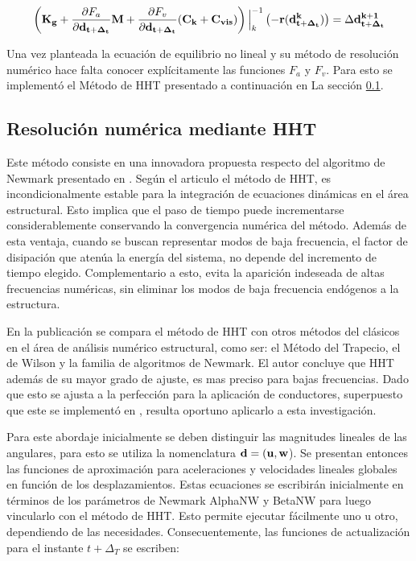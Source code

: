 \begin{equation}\label{Eq:Pre:Incremento}
	\left (\bf{K}_g+\frac{\partial\text{$ F_a$}}{\partial \bf{{d}}_{t+\Delta_t}}\bf{M} + \frac{\partial\text{$ F_v$}}{\partial \bf{{d}}_{t+\Delta_t}}(\bf{C}_k+\bf{C}_{vis} )  \right)\Big|_k^{-1} \left(-\bf{r}(\bf{d}^k_{t+\Delta_t})\right)=  \Delta\bf{d}^{k+1}_{t+\Delta_t}
\end{equation}

Una vez planteada la ecuación de equilibrio no lineal y su método de resolución numérico hace falta conocer explícitamente las funciones $F_a$ y $F_v$. Para esto se implementó el Método de HHT presentado a continuación en La sección \ref{Sec:MET:HHT}. 



\subsection{Resolución numérica mediante HHT}\label{Sec:MET:HHT}
%
 Este método consiste en una innovadora propuesta respecto del algoritmo de Newmark presentado en \cite{newmark1959method}. Según el articulo \cite{hilber1977improved} el método de HHT, es incondicionalmente estable para la integración de ecuaciones dinámicas en el área estructural. Esto implica que el paso de tiempo puede incrementarse considerablemente conservando la convergencia numérica del método. Además de esta ventaja, cuando se buscan representar modos de baja frecuencia, el factor de disipación que atenúa la energía del sistema, no depende del incremento de tiempo elegido. Complementario a esto,  evita la aparición indeseada de altas frecuencias numéricas, sin eliminar los modos de baja frecuencia endógenos a la estructura. 
 
 En la publicación \citep{hilber1977improved} se compara el método de HHT con otros métodos del clásicos en el área de análisis numérico estructural, como ser: el Método del Trapecio, el de Wilson y la familia de algoritmos de Newmark. El autor concluye que HHT además de su mayor grado de ajuste, es mas preciso para bajas frecuencias. Dado que esto se ajusta a la perfección para la aplicación de conductores, superpuesto que este se implementó en \cite{Le2014}, resulta oportuno aplicarlo a esta investigación.
 
 Para este abordaje inicialmente se deben distinguir las magnitudes lineales de las angulares, para esto se utiliza la nomenclatura $\bf{d}=(\bf{u},\bf{w}$). Se presentan entonces las funciones de aproximación para aceleraciones y velocidades lineales globales en función de los desplazamientos. Estas ecuaciones se escribirán inicialmente en términos de los parámetros de Newmark \gls{AlphaNW} y \gls{BetaNW} para luego vincularlo con el método de HHT. Esto permite ejecutar fácilmente uno u otro, dependiendo de las necesidades. Consecuentemente, las funciones de actualización para el instante $t+\Delta_T$ se escriben:
 
